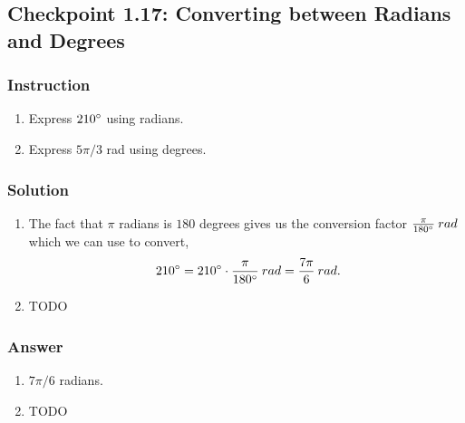\subsection*{Checkpoint 1.17: Converting between Radians and Degrees}

\subsubsection*{Instruction}

\begin{enumerate}[label=(\alph*)]
  \item
    Express $210\degree$ using radians.
  \item
    Express $5\pi/3$ rad using degrees.
\end{enumerate}

\subsubsection*{Solution}
\begin{enumerate}[label=(\alph*)]
  \item The fact that $\pi$ radians is $180$ degrees gives us the conversion factor $\frac{\pi}{180\degree} \: rad$ which we can use to convert,
    \[\phantom{.} 210 \degree = 210 \degree \cdot \frac{\pi}{180\degree} \: rad = \frac{7\pi}{6} \: rad.\]
  \item
    TODO
\end{enumerate}

\subsubsection*{Answer}

\begin{enumerate}[label=(\alph*)]
  \item
    $7\pi/6$ radians.
  \item
    TODO
\end{enumerate}
